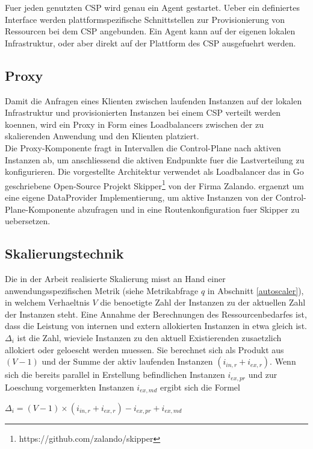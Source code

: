 \documentclass[runningheads]{llncs}
\begin{document}
Fuer jeden genutzten CSP wird genau ein Agent gestartet. Ueber ein definiertes Interface werden plattformspezifische Schnittstellen zur Provisionierung von Ressourcen bei dem CSP angebunden. Ein Agent kann auf der eigenen lokalen Infrastruktur, oder aber direkt auf der Plattform des CSP ausgefuehrt werden.
	
\subsection{Proxy}

Damit die Anfragen eines Klienten zwischen laufenden Instanzen auf der lokalen Infrastruktur und provisionierten Instanzen bei einem CSP verteilt werden koennen, wird ein Proxy in Form eines Loadbalancers zwischen der zu skalierenden Anwendung und den Klienten platziert. \\

Die Proxy-Komponente fragt in Intervallen die Control-Plane nach aktiven Instanzen ab, um anschliessend die aktiven Endpunkte fuer die Lastverteilung zu konfigurieren. Die vorgestellte Architektur verwendet als Loadbalancer das in Go geschriebene Open-Source Projekt Skipper\footnote{https://github.com/zalando/skipper} von der Firma Zalando. ergaenzt um eine eigene DataProvider Implementierung, um aktive Instanzen von der Control-Plane-Komponente abzufragen und in eine Routenkonfiguration fuer Skipper zu uebersetzen.

\subsection{Skalierungstechnik} \label{skalierungstechnik}

Die in der Arbeit realisierte Skalierung misst an Hand einer anwendungsspezifischen Metrik (siehe Metrikabfrage $q$ in Abschnitt \ref{autoscaler}), in welchem Verhaeltnis $V$ die benoetigte Zahl der Instanzen zu der aktuellen Zahl der Instanzen steht. Eine Annahme der  Berechnungen des Ressourcenbedarfes ist, dass die Leistung von internen und extern allokierten Instanzen in etwa gleich ist.  \\

$\Delta_{i}$ ist die Zahl, wieviele Instanzen zu den aktuell Existierenden zusaetzlich allokiert oder geloescht werden muessen. Sie berechnet sich als Produkt aus $(V-1)$ und der Summe der aktiv laufenden Instanzen $(i_{in,r} + i_{ex,r})$. Wenn sich die bereits parallel in Erstellung befindlichen Instanzen $i_{ex,pr}$ und zur Loeschung vorgemerkten Instanzen $ i_{ex,md}$ ergibt sich die Formel
\begin{center}
	$\Delta_{i} = (V-1) \times (i_{in,r} + i_{ex,r}) - i_{ex,pr} + i_{ex,md}$
\end{center}
\end{document}
